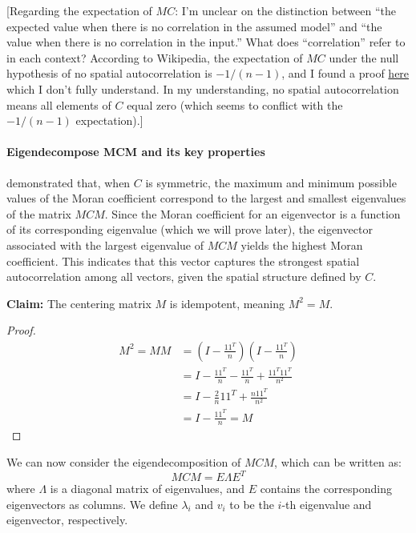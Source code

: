 \documentclass[12pt]{article}
\begin{document}
[Regarding the expectation of \( M C \): I'm unclear on the distinction between ``the expected value when there is no correlation in the assumed model'' and ``the value when there is no correlation in the input.'' What does ``correlation'' refer to in each context? According to Wikipedia, the expectation of \( M C \) under the null hypothesis of no spatial autocorrelation is \( -1 / (n - 1) \), and I found a proof \href{https://stats.stackexchange.com/questions/567411/expectation-and-variance-of-morans-i-under-the-null}{here} which I don’t fully understand. In my understanding, no spatial autocorrelation means all elements of \( C \) equal zero (which seems to conflict with the \( -1 / (n - 1) \) expectation).]

\paragraph{Eigendecompose MCM and its key properties}

\citet{de1984extreme} demonstrated that, when \( C \) is symmetric, the maximum and minimum possible values of the Moran coefficient correspond to the largest and smallest eigenvalues of the matrix \( MCM \). Since the Moran coefficient for an eigenvector is a function of its corresponding eigenvalue (which we will prove later), the eigenvector associated with the largest eigenvalue of \( MCM \) yields the highest Moran coefficient. This indicates that this vector captures the strongest spatial autocorrelation among all vectors, given the spatial structure defined by \( C \).

{\bf Claim:} The centering matrix \( M \) is idempotent, meaning \( M^2 = M \).

\begin{proof}
  \begin{align*}
    M^2 = M M & = \left( I - \frac{1 1^T}{n} \right) \left( I - \frac{1 1^T}{n} \right) \\
              & = I - \frac{1 1^T}{n} - \frac{1 1^T}{n} + \frac{1 1^T 1 1^T}{n^2} \\
              & = I - \frac{2}{n} 1 1^T + \frac{n 1 1^T}{n^2} \\
              & = I - \frac{1 1^T}{n} = M
  \end{align*}
\end{proof}

We can now consider the eigendecomposition of \( M C M \), which can be written as:
\[
  M C M = E \Lambda E^{T}
\]
where \( \Lambda \) is a diagonal matrix of eigenvalues, and \( E \) contains the corresponding eigenvectors as columns. We define \( \lambda_i \) and \( v_i \) to be the \( i \)-th eigenvalue and eigenvector, respectively.
\end{document}
